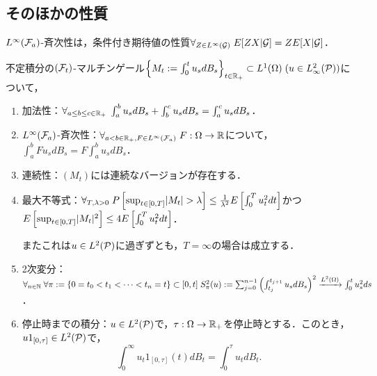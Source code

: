 \documentclass[uplatex,dvipdfmx]{jsreport}
\begin{document}
\subsection{そのほかの性質}

\begin{tcolorbox}[colframe=ForestGreen, colback=ForestGreen!10!white,breakable,colbacktitle=ForestGreen!40!white,coltitle=black,fonttitle=\bfseries\sffamily,
title=]
    $L^\infty(\F_a)$-斉次性は，条件付き期待値の性質$\forall_{Z\in L^\infty(\cG)}\;E[ZX|\cG]=ZE[X|\cG]$．
\end{tcolorbox}

\begin{proposition}
    不定積分の$(\F_t)$-マルチンゲール$\Brace{M_t:=\int^t_0 u_sdB_s}_{t\in\R_+}\subset L^1(\Om)\;(u\in L^2_\infty(\P))$について，
    \begin{enumerate}
        \item 加法性：$\forall_{a\le b\le c\in\R_+}\;\int^b_au_sdB_s+\int^c_bu_sdB_s=\int^c_au_sdB_s$．
        \item $L^\infty(\F_a)$-斉次性：$\forall_{a<b\in\R_+,F\in L^\infty(\F_a)}\;F:\Om\to\R$について，$\int^b_aFu_sdB_s=F\int^b_au_sdB_s$．
        \item 連続性：$(M_t)$には連続なバージョンが存在する．
        \item 最大不等式：$\forall_{T,\lambda>0}\;P\Square{\sup_{t\in[0,T]}\abs{M_t}>\lambda}\le\frac{1}{\lambda^2}E\Square{\int^T_0u^2_tdt}$かつ$E\Square{\sup_{t\in[0,T]}\abs{M_t}^2}\le 4E\Square{\int^T_0u^2_tdt}$．
        
        またこれは$u\in L^2(\P)$に過ぎずとも，$T=\infty$の場合は成立する．
        \item 2次変分：$\forall_{n\in\N}\;\forall{\pi:=\{0=t_0<t_1<\cdots<t_n=t\}\subset[0,t]}\;S^2_\pi(u):=\sum^{n-1}_{j=0}\paren{\int^{t_{j+1}}_{t_j}u_sdB_s}^2\xrightarrow{L^2(\Om)}\int^t_0u^2_sds$．
        \item 停止時までの積分：$u\in L^2(\P)$で，$\tau:\Om\to\R_+$を停止時とする．このとき，$u1_{[0,\tau]}\in L^2(\P)$で，
        \[\int^\infty_0u_t1_{[0,\tau]}(t)dB_t=\int^\tau_0u_tdB_t.\]
    \end{enumerate}
\end{proposition}
\end{document}
